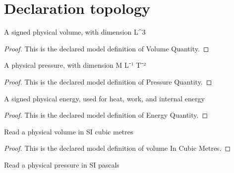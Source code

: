 \section{Declaration topology}
\begin{definition}
  \label{def:physics:phyx-mini-0408:phyxminiproblems-problemphyxmini0408-volumequantity}
  A signed physical volume, with dimension L\textasciicircum{}3
\end{definition}
\begin{proof}
  This is the declared model definition of Volume Quantity.
\end{proof}
\begin{definition}
  \label{def:physics:phyx-mini-0408:phyxminiproblems-problemphyxmini0408-pressurequantity}
  A physical pressure, with dimension M L⁻¹ T⁻²
\end{definition}
\begin{proof}
  This is the declared model definition of Pressure Quantity.
\end{proof}
\begin{definition}
  \label{def:physics:phyx-mini-0408:phyxminiproblems-problemphyxmini0408-energyquantity}
  A signed physical energy, used for heat, work, and internal energy
\end{definition}
\begin{proof}
  This is the declared model definition of Energy Quantity.
\end{proof}
\begin{definition}
  \label{def:physics:phyx-mini-0408:phyxminiproblems-problemphyxmini0408-volumeincubicmetres}
  Read a physical volume in SI cubic metres
\end{definition}
\begin{proof}
  This is the declared model definition of volume In Cubic Metres.
\end{proof}
\begin{definition}
  \label{def:physics:phyx-mini-0408:phyxminiproblems-problemphyxmini0408-pressureinpascals}
  Read a physical pressure in SI pascals
\end{definition}
